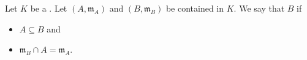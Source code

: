 \begin{definition} \label{definition:dominates_a_local_ring_for_a_local_ring_in_a_field}
    Let $K$ be a . Let $(A,\mathfrak{m}_A)$ and $(B,\mathfrak{m}_B)$ be  contained in $K$. 
    We say that $B$  if 
    \begin{itemize}
        \item $A \subseteq B$ and 
        \item $\mathfrak{m}_B \cap A = \mathfrak{m}_A$.
    \end{itemize}
\end{definition}